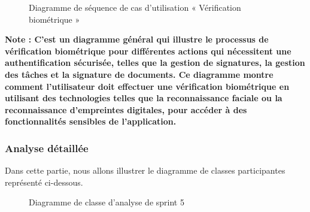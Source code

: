 \begin{figure}[H]
  \centering
  \caption{Diagramme de séquence de cas d'utilisation « Vérification biométrique »}
  \label{fig:sequence_verification_biometrique}
\end{figure}  
\textbf{Note : C'est un diagramme général qui illustre le processus de vérification biométrique pour différentes actions qui nécessitent une authentification sécurisée, telles que la gestion de signatures, la gestion des tâches et la signature de documents. Ce diagramme montre comment l'utilisateur doit effectuer une vérification biométrique en utilisant des technologies telles que la reconnaissance faciale ou la reconnaissance d'empreintes digitales, pour accéder à des fonctionnalités sensibles de l'application.}


\subsubsection{Analyse détaillée}
Dans cette partie, nous allons illustrer le diagramme de classes participantes représenté ci-dessous.

\setlength{\parskip}{1em}
\setlength{\parindent}{0em}



\begin{figure}[H]
  \centering
  \caption{Diagramme de classe d'analyse de sprint 5}
  \label{fig:class_analyse_sprint5}
\end{figure}


